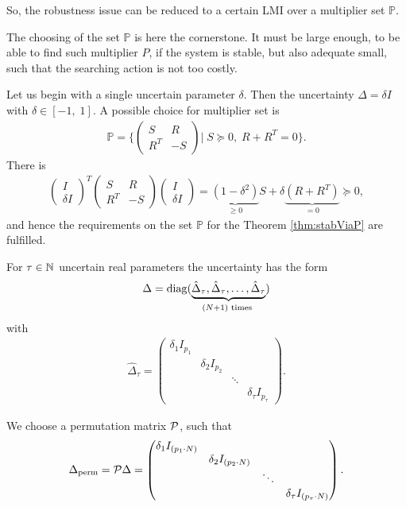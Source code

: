 So, the robustness issue can be reduced to a certain LMI over a multiplier set $\mathbb{P}$. 

The choosing of the set $\mathbb{P}$ is here the cornerstone. It must be large enough, to be able to find such multiplier $P$, if the system is stable, but also adequate small, such that the searching action is not too costly. 
 
Let us begin with a single uncertain parameter $\delta$. Then the uncertainty $\Delta = \delta I$ with $\delta \in [-1,\; 1]$. 
A possible choice for multiplier set is 
\begin{align}
\mathbb{P}= \{ \begin{pmatrix}
S & R \\ R^T & -S
\end{pmatrix}| \; S \succeq 0 , \; R + R^T = 0\}.
\end{align}
There is 
\begin{align}
\begin{pmatrix}
I \\ \delta I
\end{pmatrix}^T 
\begin{pmatrix}
S & R \\ R^T & -S
\end{pmatrix}
\begin{pmatrix}
I \\ \delta I
\end{pmatrix} = \underbrace{(1 - \delta^2 )}_{\geq 0}S + \delta\underbrace{(R + R^T)}_{=0} \succeq 0,
\end{align}
and hence the requirements on the set $\mathbb{P}$ for the Theorem \eqref{thm:stabViaP} are fulfilled. 

For $\tau \in {\mathbb{N}}$ uncertain real parameters the uncertainty has the form 
\begin{align}\Delta= \operatorname*{diag}(\underbrace{\hat{\Delta}_\tau, \hat{\Delta}_\tau, \dots, \hat{\Delta}_\tau}_{(N+1) \text{ times }})\end{align}
with
\begin{align}
\hat{\Delta}_\tau = \begin{pmatrix}
\delta_1 I_{p_1}& & & \\
& \delta_2 I_{p_2} & & \\
& & \ddots & \\
& & & \delta_\tau I_{p_\tau}
\end{pmatrix}.
\end{align}

We choose a permutation matrix $\mathcal{P}$, such that 
\begin{align}
\label{eq:rob:PDelta}
\Delta_\text{perm}= 
\mathcal{P} \Delta =
\begin{pmatrix}
\delta_1 I_{(p_1\cdot N)} & & &\\
& \delta_2 I_{(p_2\cdot N)} & & \\
& & \ddots & \\
& & & \delta_\tau I_{(p_\tau \cdot N)}
\end{pmatrix}.
\end{align}

